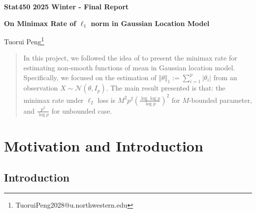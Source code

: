 \documentclass[11pt,a4paper]{article}
\numberwithin{equation}{section}%
\begin{document}
\begin{center}\thispagestyle{plain}

{\LARGE\textbf{Stat450 2025 Winter - Final Report}}

{\Large\textbf{On Minimax Rate of $ \ell_1 $ norm in Gaussian Location Model}}

Tuorui Peng\footnote{TuoruiPeng2028@u.northwestern.edu}
\end{center}

\thispagestyle{myheadings}
\pagestyle{myheadings}


\begin{abstract}
    In this project, we followed the idea of \cite{cai2011testing} to present the minimax rate for estimating non-smooth functions of mean in Gaussian location model. Specifically, we focused on the estimation of $ \left\Vert \theta  \right\Vert _1 := \sum_{i=1}^p \left\vert \theta _i \right\vert  $ from an observation $ X\sim \mathcal{N}(\theta ,I_p) $. The main result presented is that: the minimax rate under $ \ell_2 $ loss is $ M^2p^2\left(\frac{\log\log p}{\log p}\right)^2 $ for $ M $-bounded parameter, and $ \frac{p^2}{\log p} $ for unbounded case.
\end{abstract}


\section{Motivation and Introduction}

\subsection{Introduction}
\end{document}
